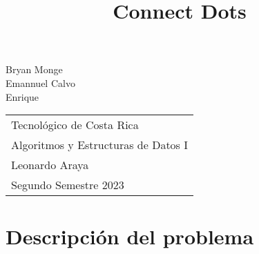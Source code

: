 \documentclass[12pt, letterpaper, twoside]{article}
\title{Connect Dots}
\author{}
\newcommand{\institute}{Tecnológico de Costa Rica}
\newcommand{\coursename}{Algoritmos y Estructuras de Datos I}
\newcommand{\professor}{Leonardo Araya}
\newcommand{\semester}{Segundo Semestre 2023}
\begin{document}
	
	\begin{titlepage}
		\maketitle
		
		\vspace{2cm}
		
		\begin{center}
			{\Large Bryan Monge \\[0.5cm] Emannuel Calvo \\[0.5cm] Enrique \\[1cm]}
		\end{center}
		
		\begin{center}
			\begin{tabular}{l}
				\institute \\
				\coursename \\
				\professor \\
				\semester \\
			\end{tabular}
		\end{center}
		
	\end{titlepage}
	
	\vfill
	
	\section*{Descripción del problema}
	
\end{document}
